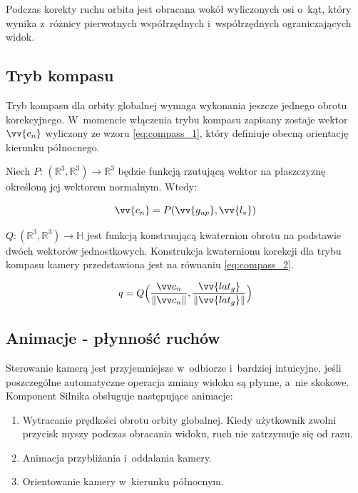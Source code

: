 Podczas korekty ruchu orbita jest obracana wokół wyliczonych osi o~kąt, który wynika z~różnicy pierwotnych współrzędnych i~współrzędnych ograniczających widok.

\subsection{Tryb kompasu}

Tryb kompasu dla orbity globalnej wymaga wykonania jeszcze jednego obrotu korekcyjnego. W~momencie włączenia trybu kompasu zapisany zostaje wektor $\vv{c_n}$ wyliczony ze wzoru \ref{eq:compass_1}, który definiuje obecną orientację kierunku północnego.

Niech $P:\,(\mathbb{R}^3, \mathbb{R}^3) \to \mathbb{R}^3$ będzie funkcją rzutującą wektor na płaszczyznę określoną jej wektorem normalnym. Wtedy:

\begin{samepage}
  \begin{equation}
    \label{eq:compass_1}
      \vv{c_n} = P(\vv{g_{up}}, \vv{l_v})
  \end{equation}
  \vspace{\baselineskip}
\end{samepage}



$Q:(\mathbb{R}^3, \mathbb{R}^3) \to \mathbb{H}$ jest funkcją konstruującą kwaternion obrotu na podstawie dwóch wektorów jednostkowych. Konstrukcja kwaternionu korekcji dla trybu kompasu kamery przedstawiona jest na równaniu \ref{eq:compass_2}.
\begin{samepage}
  \begin{equation}
    \label{eq:compass_2}
      q = Q\Big(\normalize{\vv c_n}, \normalize{\vv{lat_g}}\Big)
  \end{equation}
  \vspace{\baselineskip}
\end{samepage}

\subsection{Animacje - płynność ruchów}

Sterowanie kamerą jest przyjemniejsze w~odbiorze i~bardziej intuicyjne, jeśli poszczególne automatyczne operacja zmiany widoku są płynne, a~nie skokowe. Komponent Silnika obsługuje następujące animacje:
\begin{enumerate}
    \item Wytracanie prędkości obrotu orbity globalnej. Kiedy użytkownik zwolni przycisk myszy podczas obracania widoku, ruch nie zatrzymuje się od razu.
    \item Animacja przybliżania i~oddalania kamery.
    \item Orientowanie kamery w~kierunku północnym.
\end{enumerate}

